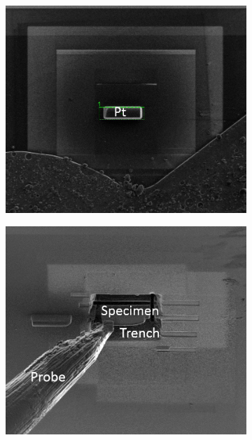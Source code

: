 \begin{figure}
	\begin{subfigure}[b]{0.3\textwidth}
		\centering
		\includegraphics[width=.95\linewidth]{Figs/Ch2/FIB1}
		\caption{}
		
	\end{subfigure}%
	\hspace*{0.5cm}
	\begin{subfigure}[b]{0.3\textwidth}
		\centering
		\includegraphics[width=.95\linewidth]{Figs/Ch2/FIB2}
		\caption{}
		

\end{subfigure}
\end{figure}
